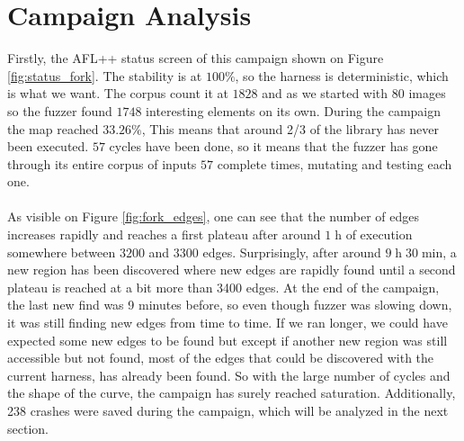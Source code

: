 \section{Campaign Analysis}
Firstly, the AFL++ status screen of this campaign shown on Figure \ref{fig:status_fork}. The stability is at $100\%$, so the harness is deterministic, which is what we want. The corpus count it at $1828$ and as we started with $80$ images so the fuzzer found $1748$ interesting elements on its own. During the campaign the map reached $33.26\%$, This means that around 2/3 of the library has never been executed. $57$ cycles have been done, so it means that the fuzzer has gone through its entire corpus of inputs $57$ complete times, mutating and testing each one.\\\\
As visible on Figure \ref{fig:fork_edges}, one can see that the number of edges increases rapidly and reaches a first plateau after around $1\;\mathrm{h}$ of execution somewhere between $3200$ and $3300$ edges. Surprisingly, after around $9\;\mathrm{h}\;30\;\mathrm{min}$, a  new region has been discovered where new edges are rapidly found until a second plateau is reached at a bit more than 3400 edges. At the end of the campaign, the last new find was 9 minutes before, so even though fuzzer was slowing down, it was still finding new edges from time to time. If we ran longer, we could have expected some new edges to be found but except if another new region was still accessible but not found, most of the edges that could be discovered with the current harness, has already been found. So with the large number of cycles and the shape of the curve, the campaign has surely reached saturation. Additionally, 238 crashes were saved during the campaign, which will be analyzed in the next section.